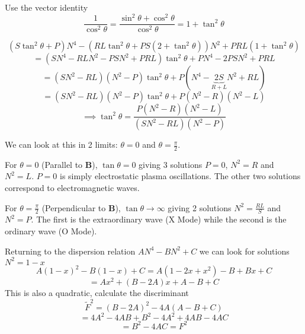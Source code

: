 Use the vector identity
\begin{equation}
	\frac{1}{\cos^2 \theta} = \frac{\sin^2 \theta + \cos^2 \theta}{\cos^2 \theta} = 1 + \tan^2 \theta
\end{equation}

\begin{equation*}
	\left( S \tan^2 \theta + P \right)N^4 - \left( RL \tan^2 \theta + PS \left( 2 + \tan^2 \theta \right) \right) N^2 + PRL \left( 1 + \tan^2 \theta \right)
\end{equation*}
\begin{equation*}
	= \left( SN^4 - RLN^2 - PSN^2 + PRL \right) \tan^2 \theta + PN^4 - 2PSN^2 + PRL
\end{equation*}
\begin{equation*}
	= \left( SN^2 - RL \right) \left( N^2 - P \right) \tan^2 \theta + P \left( N^4 - \underbrace{2S}_{R + L} N^2 + RL \right)
\end{equation*}
\begin{equation*}
	= \left( SN^2 - RL \right) \left( N^2 - P \right) \tan^2 \theta + P \left( N^2 - R \right) \left( N^2 - L \right)
\end{equation*}
\begin{equation}
	\implies \tan^2 \theta = \frac{P \left( N^2 - R \right) \left( N^2 - L \right)}{\left( SN^2 - RL \right) \left( N^2 - P \right)}
\end{equation}

We can look at this in 2 limits: $\theta = 0$ and $\theta = \frac{\pi}{2}$.

For $\theta = 0$ (Parallel to $\bm{B}$), $\tan \theta = 0$ giving 3 solutions $P = 0$, $N^2 = R$ and $N^2 = L$. $P=0$ is simply electrostatic plasma oscillations. The other two solutions correspond to electromagnetic waves.

For $\theta = \frac{\pi}{2}$ (Perpendicular to $\bm{B}$), $\tan \theta \rightarrow \infty$ giving 2 solutions $N^2 = \frac{RL}{S}$ and $N^2 = P$. The first is the extraordinary wave (X Mode) while the second is the ordinary wave (O Mode).

Returning to the dispersion relation $AN^4 - BN^2 + C$ we can look for solutions $N^2 = 1 - x$
\begin{equation*}
	A\left( 1 - x \right)^2 - B\left(1 - x \right) + C = A \left( 1 - 2x + x^2 \right) - B + Bx + C
\end{equation*}
\begin{equation*}
	= Ax^2 + \left( B - 2A \right) x + A - B + C
\end{equation*}
This is also a quadratic, calculate the discriminant
\begin{equation*}
	\tilde{F}^2 = \left( B - 2A \right)^2 - 4A \left( A - B + C\right)
\end{equation*}
\begin{equation*}
	= 4A^2 - 4AB + B^2 - 4A^2 + 4AB - 4AC
\end{equation*}
\begin{equation*}
	= B^2 - 4AC = F^2
\end{equation*}

